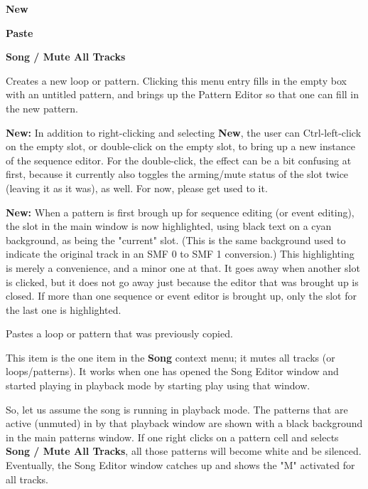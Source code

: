   \begin{enumber}
      \item \textbf{New}
      \item \textbf{Paste}
      \item \textbf{Song / Mute All Tracks}
   \end{enumber}

   \setcounter{ItemCounter}{0}      %

   Creates a new loop or pattern.
   Clicking this menu entry fills in the empty box with an untitled
   pattern, and brings up the Pattern Editor
   so that one can fill in the new pattern.

   \textbf{New:}
   In addition to right-clicking and selecting \textbf{New}, the user
   can Ctrl-left-click on the empty slot, or
   double-click on the empty slot, to bring up a new instance of the sequence
   editor.  For the double-click, the effect can be a bit confusing at first,
   because it currently also toggles the arming/mute status of the slot
   twice (leaving it as it was), as well.  For now, please get used to it.

   \textbf{New:}
   When a pattern is first brough up for sequence editing (or event
   editing), the slot in the main window is now highlighted, using black
   text on a cyan background, as being the "current" slot.
   (This is the same background used to indicate the original track in an
    SMF 0 to SMF 1 conversion.)
   This highlighting is merely a convenience, and a minor one at that.
   It goes away when another slot is clicked, but it does not go away just
   because the editor that was brought up is closed.  If more than one
   sequence or event editor is brought up, only the slot
   for the last one is highlighted.

   Pastes a loop or pattern that was previously copied.

   This item is the one item in the \textbf{Song} context menu;
   it mutes all tracks (or loops/patterns).
   It works when one has opened the Song Editor window
   and started playing in playback
   mode by starting play using that window.

   So, let us assume the song is running in playback mode.  The patterns that
   are active (unmuted) in by that playback window are shown with a black
   background in the main patterns window.  If one right clicks on a pattern
   cell and selects \textbf{Song / Mute All Tracks}, all those patterns
   will become white and be silenced.  Eventually, the Song Editor window
   catches up and shows the "M" activated for all tracks.
   
